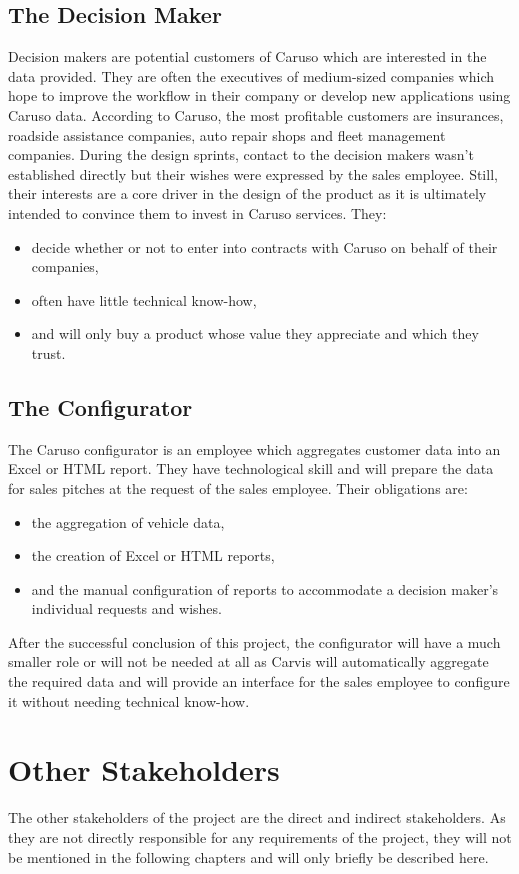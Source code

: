 \subsection{The Decision Maker}
Decision makers are potential customers of Caruso which are interested in the data provided. They are often the executives of medium-sized companies which hope to improve the workflow in their company or develop new applications using Caruso data. According to Caruso, the most profitable customers are insurances, roadside assistance companies, auto repair shops and fleet management companies. During the design sprints, contact to the decision makers wasn't established directly but their wishes were expressed by the sales employee. Still, their interests are a core driver in the design of the product as it is ultimately intended to convince them to invest in Caruso services. They:
\begin{itemize}
  \item decide whether or not to enter into contracts with Caruso on behalf of their companies,
  \item often have little technical know-how,
  \item and will only buy a product whose value they appreciate and which they trust.
\end{itemize}

\subsection{The Configurator}
The Caruso configurator is an employee which aggregates customer data into an Excel or HTML report. They have technological skill and will prepare the data for sales pitches at the request of the sales employee. Their obligations are:
\begin{itemize}
  \item the aggregation of vehicle data,
  \item the creation of Excel or HTML reports,
  \item and the manual configuration of reports to accommodate a decision maker's individual requests and wishes.
\end{itemize}
After the successful conclusion of this project, the configurator will have a much smaller role or will not be needed at all as Carvis will automatically aggregate the required data and will provide an interface for the sales employee to configure it without needing technical know-how.

\section{Other Stakeholders}
The other stakeholders of the project are the direct and indirect stakeholders. As they are not directly responsible for any requirements of the project, they will not be mentioned in the following chapters and will only briefly be described here.

